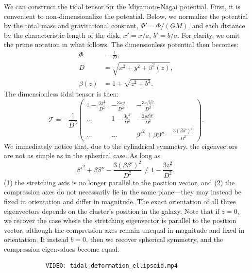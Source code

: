             We can construct the tidal tensor for the Miyamoto-Nagai potential. First, it is convenient to non-dimensionalize the potential. Below, we normalize the potential by the total mass and gravitational constant, $\Phi\prime = \Phi / (GM)$, and each distance by the characteristic length of the disk, $x\prime = x/a$, $b\prime = b/a$. For clarity, we omit the prime notation in what follows. The dimensionless potential then becomes:            
            \begin{eqnarray}
                \Phi   &= \frac{1}{D},\\
                D       &= \sqrt{x^2 + y^2 + \beta^2(z)},\\
                \beta(z)   &= 1 + \sqrt{z^2 + b^2}.
            \end{eqnarray}
            The dimensionless tidal tensor is then: 
            \begin{equation}
                \mathcal{T}=-\frac{1}{D^3}\left(\begin{matrix}
                    1-\frac{3x^2}{D^2} & -\frac{3xy}{D^2} & -\frac{3x\beta \beta'}{D^2} \\
                    \dots & 1-\frac{3y^2}{D^2} & -\frac{3y\beta \beta'}{D^2} \\
                    \dots & \dots & \beta'^2 + \beta \beta'' -\frac{3\left(\beta\beta'\right)^2}{D^2}
                \end{matrix}\right).
            \end{equation}             
            We immediately notice that, due to the cylindrical symmetry, the eigenvectors are not as simple as in the spherical case. As long as 
            \[
            \beta'^2 + \beta \beta'' - \frac{3\left(\beta \beta'\right)^2}{D^2} \neq 1 - \frac{3z^2}{D^2},
            \]
            (1) the stretching axis is no longer parallel to the position vector, and (2) the compression axes do not necessarily lie in the same plane—they may instead be fixed in orientation and differ in magnitude. The exact orientation of all three eigenvectors depends on the cluster's position in the galaxy. Note that if $z = 0$, we recover the case where the stretching eigenvector is parallel to the position vector, although the compression axes remain unequal in magnitude and fixed in orientation. If instead $b = 0$, then we recover spherical symmetry, and the compression eigenvalues become equal.
            \begin{verbatim}
            VIDEO: tidal_deformation_ellipsoid.mp4
            \end{verbatim}

